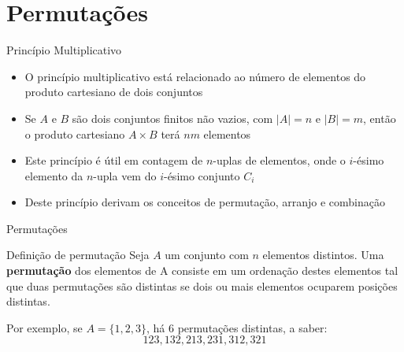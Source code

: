 \section{Permutações}

\begin{frame}[fragile]{Princípio Multiplicativo}

    \begin{itemize}
        \item O princípio multiplicativo está relacionado ao número de elementos do produto cartesiano de dois 
            conjuntos

        \item Se $A$ e $B$ são dois conjuntos finitos não vazios, com $|A| = n$ e $|B| = m$, então  o produto
            cartesiano $A\times B$ terá $nm$ elementos

        \item Este princípio é útil em contagem de $n$-uplas de elementos, onde o $i$-ésimo elemento da $n$-upla vem 
            do $i$-ésimo conjunto $C_i$

        \item Deste princípio derivam os conceitos de permutação, arranjo e combinação
    \end{itemize}

\end{frame}

\begin{frame}[fragile]{Permutações}

    \begin{block}{Definição de permutação}
        Seja $A$ um conjunto com $n$ elementos distintos. Uma \textbf{permutação} dos elementos de A 
        consiste em um ordenação destes elementos tal que duas permutações são distintas se dois ou 
        mais elementos ocuparem posições distintas.
    \end{block}

    Por exemplo, se $A = \{1, 2, 3\}$, há 6 permutações distintas, a saber:
$$
123, 132, 213, 231, 312, 321
$$

\end{frame}

